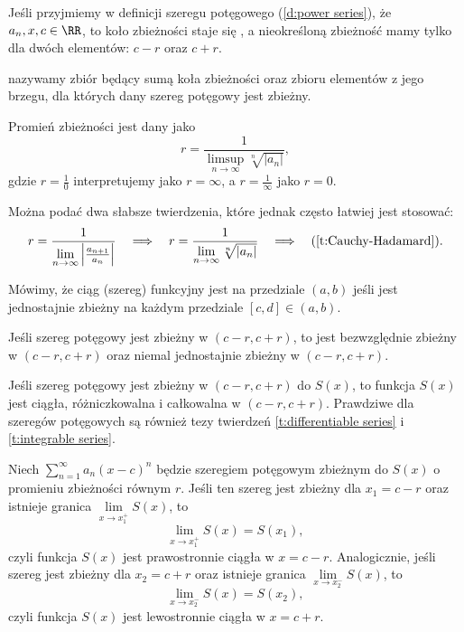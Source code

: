 \begin{remark*}
    Jeśli przyjmiemy w definicji szeregu potęgowego (\ref{d:power series}), że $a_n, x, c \in \RR$, to koło zbieżności staje się , a nieokreśloną zbieżność mamy tylko dla dwóch elementów: $c - r$ oraz $c + r$.
\end{remark*}

 nazywamy zbiór będący sumą koła zbieżności oraz zbioru elementów z jego brzegu, dla których dany szereg potęgowy jest zbieżny.

\begin{theorem}
    \label{t:Cauchy-Hadamard}
    Promień zbieżności jest dany jako
    \[ r = \frac{1}{\limsup\limits_{n\to\infty}\sqrt[n]{|a_n|}}, \]
    gdzie $r = \frac{1}{0}$ interpretujemy jako $r = \infty$, a $r = \frac{1}{\infty}$ jako $r = 0$.
\end{theorem}

Można podać dwa słabsze twierdzenia, które jednak często łatwiej jest stosować:
\[ r = \frac{1}{\lim\limits_{n\to\infty} \left|\frac{a_{n+1}}{a_n}\right|} \hspace{1em}\Longrightarrow\hspace{1em} r = \frac{1}{\lim\limits_{n\to\infty}\sqrt[n]{|a_n|}} \hspace{1em}\Longrightarrow\hspace{1em} (\ref{t:Cauchy-Hadamard}). \]

Mówimy, że ciąg (szereg) funkcyjny jest  na przedziale $(a, b)$ jeśli jest jednostajnie zbieżny na każdym przedziale $[c, d] \in (a, b)$.

\begin{fact}
    Jeśli szereg potęgowy jest zbieżny w $(c-r, c+r)$, to jest bezwzględnie zbieżny w $(c-r, c+r)$ oraz niemal jednostajnie zbieżny w $(c-r, c+r)$.
\end{fact}

\begin{fact}
    Jeśli szereg potęgowy jest zbieżny w $(c-r, c+r)$ do $S(x)$, to funkcja $S(x)$ jest ciągła, różniczkowalna i całkowalna w $(c-r, c+r)$. Prawdziwe dla szeregów potęgowych są również tezy twierdzeń \ref{t:differentiable series} i \ref{t:integrable series}.
\end{fact}

\begin{theorem}[Abela]
    \label{t:Abel}
    Niech $\sum_{n=1}^\infty a_n(x - c)^n$ będzie szeregiem potęgowym zbieżnym do $S(x)$ o promieniu zbieżności równym $r$. Jeśli ten szereg jest zbieżny dla $x_1 = c - r$ oraz istnieje granica $\lim\limits_{x\to x_1^+}S(x)$, to
    \[ \lim_{x\to x_1^+}S(x) = S(x_1), \]
    czyli funkcja $S(x)$ jest prawostronnie ciągła w $x = c - r$. Analogicznie, jeśli szereg jest zbieżny dla $x_2 = c + r$ oraz istnieje granica $\lim\limits_{x\to x_2^-}S(x)$, to
    \[ \lim_{x\to x_2^-}S(x) = S(x_2), \]
    czyli funkcja $S(x)$ jest lewostronnie ciągła w $x = c + r$.
\end{theorem}

